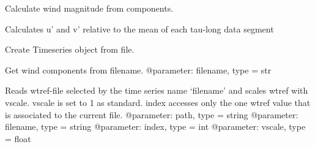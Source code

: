 \documentclass[letterpaper,10pt,english]{sphinxmanual}
\begin{document}
\begin{fulllineitems}
\begin{fulllineitems}
\end{fulllineitems}


\begin{fulllineitems}
\label{\detokenize{index:windtunnel.Timeseries.calc_magnitude}}
Calculate wind magnitude from components.

\end{fulllineitems}


\begin{fulllineitems}
\label{\detokenize{index:windtunnel.Timeseries.calc_perturbations}}
Calculates u’ and v’ relative to the mean of each tau-long data 
segment

\end{fulllineitems}


\begin{fulllineitems}
\label{\detokenize{index:windtunnel.Timeseries.from_file}}
Create Timeseries object from file.

\end{fulllineitems}


\begin{fulllineitems}
\label{\detokenize{index:windtunnel.Timeseries.get_wind_comps}}
Get wind components from filename.
@parameter: filename, type = str

\end{fulllineitems}


\begin{fulllineitems}
\label{\detokenize{index:windtunnel.Timeseries.get_wtref}}
Reads wtref-file selected by the time series name ‘filename’ and
scales wtref with vscale. vscale is set to 1 as standard. index
accesses only the one wtref value that is associated to the current
file.
@parameter: path, type = string
@parameter: filename, type = string
@parameter: index, type = int
@parameter: vscale, type = float


\end{fulllineitems}
\end{fulllineitems}
\end{document}
